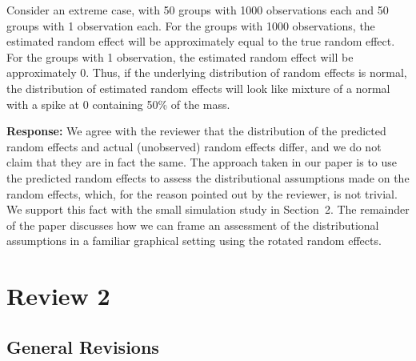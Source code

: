 \documentclass[11pt]{article}
\begin{document}
Consider an extreme case, with 50 groups with 1000 observations each and 50 groups with 1 observation each.  For the groups with 1000 observations, the estimated random effect will be approximately equal to the true random effect.  For the groups with 1 observation, the estimated random effect will be approximately 0.  Thus, if the underlying distribution of random effects is normal, the distribution of estimated random effects will look like mixture of a normal with a spike at 0 containing 50\% of the mass.

\textbf{Response:} We agree with the reviewer that the distribution of the predicted random effects and actual (unobserved) random effects differ, and we do not claim that they are in fact the same. The approach taken in our paper is to use the predicted random effects to assess the distributional assumptions made on the random effects, which, for the reason pointed out by the reviewer, is not trivial. We support this fact with the small simulation study in Section~2. The remainder of the paper discusses how we can frame an assessment of the distributional assumptions in a familiar graphical setting using the rotated random effects.


\section*{Review 2}

\subsection*{General Revisions}
\end{document}
